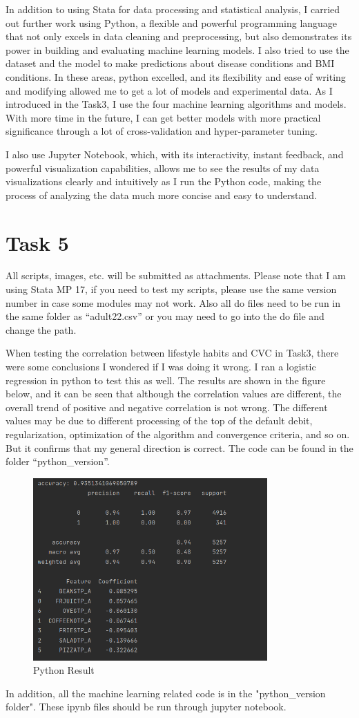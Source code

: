 \documentclass{article}
\begin{document}
In addition to using Stata for data processing and statistical analysis, I carried out further work using Python, a flexible and powerful programming language that not only excels in data cleaning and preprocessing, but also demonstrates its power in building and evaluating machine learning models. I also tried to use the dataset and the model to make predictions about disease conditions and BMI conditions. In these areas, python excelled, and its flexibility and ease of writing and modifying allowed me to get a lot of models and experimental data. As I introduced in the Task3, I use the four machine learning algorithms and models. With more time in the future, I can get better models with more practical significance through a lot of cross-validation and hyper-parameter tuning.


I also use Jupyter Notebook, which, with its interactivity, instant feedback, and powerful visualization capabilities, allows me to see the results of my data visualizations clearly and intuitively as I run the Python code, making the process of analyzing the data much more concise and easy to understand.


\newpage
\section{Task 5}
All scripts, images, etc. will be submitted as attachments. Please note that I am using Stata MP 17, if you need to test my scripts, please use the same version number in case some modules may not work. Also all do files need to be run in the same folder as “adult22.csv” or you may need to go into the do file and change the path. 

When testing the correlation between lifestyle habits and CVC in Task3, there were some conclusions I wondered if I was doing it wrong. I ran a logistic regression in python to test this as well. The results are shown in the figure below, and it can be seen that although the correlation values are different, the overall trend of positive and negative correlation is not wrong. The different values may be due to different processing of the top of the default debit, regularization, optimization of the algorithm and convergence criteria, and so on. But it confirms that my general direction is correct. The code can be found in the folder “python\_version”.

\begin{figure}[!h]
	\centering
	\includegraphics[width=0.8\textwidth]{../Image/python.jpg}
	\caption{Python Result}
	\label{fig:G10}
\end{figure}

In addition, all the machine learning related code is in the "python\_version folder". These ipynb files should be run through jupyter notebook.
\end{document}
